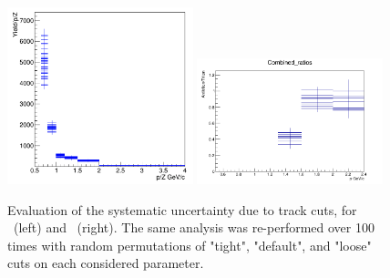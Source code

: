 \begin{figure}
    \centering
    \includegraphics[width=0.48\textwidth]{figures/he3_tracking_systematics.png}
    \includegraphics[width=0.48\textwidth]{figures/triton/Systematics_tritons.png}
    \caption{Evaluation of the systematic uncertainty due to track cuts, for \ahe\ (left) and \atrit\ (right). The same analysis was re-performed over 100 times with random permutations of "tight", "default", and "loose" cuts on each considered parameter.}
    \label{fig:TrackingSystematics}
\end{figure}

